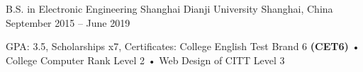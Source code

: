 

\begin{cventries}

  \cventry
    {B.S. in Electronic Engineering} %
    {Shanghai Dianji University} %
    {Shanghai, China} %
    {September 2015 -- June 2019} %
    {
      \begin{cvitems} %
        \item {GPA: 3.5, Scholarships x7, Certificates: College English Test Brand 6 \textbf{(CET6)} • College Computer Rank Level 2 • Web Design of CITT Level 3}
      \end{cvitems}
    }

\end{cventries}
